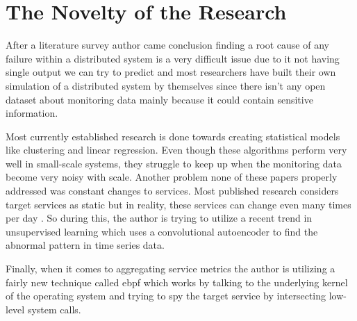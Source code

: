\section{The Novelty of the Research}

After a literature survey author came conclusion finding a root cause of any failure within a distributed system is a very difficult issue due to it not having single output we can try to predict and most researchers have built their own simulation of a distributed system by themselves since there isn't any open dataset about monitoring data mainly because it could contain sensitive information. 

Most currently established research is done towards creating statistical models like clustering and linear regression. Even though these algorithms perform very well in small-scale systems, they struggle to keep up when the monitoring data become very noisy with scale. Another problem none of these papers properly  addressed was constant changes to services. Most published research considers target services as static but in reality, these services can change even many times per day \citep{GoingtoM51:online}. So during this, the author is trying to utilize a recent trend in unsupervised learning which uses a convolutional autoencoder to find the abnormal pattern in time series data.

Finally, when it comes to aggregating service metrics the author is utilizing a fairly new technique called \ac{ebpf} which works by talking to the underlying kernel of the operating system and trying to spy the target service by intersecting low-level system calls.